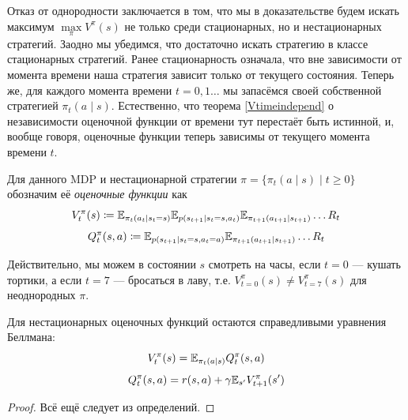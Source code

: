 Отказ от однородности заключается в том, что мы в доказательстве будем искать максимум $\max\limits_\pi V^\pi(s)$ не только среди стационарных, но и нестационарных стратегий. Заодно мы убедимся, что достаточно искать стратегию в классе стационарных стратегий. Ранее стационарность означала, что вне зависимости от момента времени наша стратегия зависит только от текущего состояния. Теперь же, для каждого момента времени $t = 0, 1 \dots$ мы запасёмся своей собственной стратегией $\pi_t(a \mid s)$. Естественно, что теорема \ref{Vtimeindepend} о независимости оценочной функции от времени тут перестаёт быть истинной, и, вообще говоря, оценочные функции теперь зависимы от текущего момента времени $t$. 

\begin{definition}
Для данного MDP и нестационарной стратегии $\pi = \{ \pi_t(a \mid s) \mid t \ge 0 \}$ обозначим её \emph{оценочные функции} как 
$$V^\pi_t(s) \coloneqq \mathbb{E}_{\pi_t(a_t \mid s_t = s)}\mathbb{E}_{p(s_{t+1} \mid s_t=s, a_t)}\mathbb{E}_{\pi_{t+1}(a_{t+1} \mid s_{t+1})} \dots R_t$$
$$Q^\pi_t(s, a) \coloneqq \mathbb{E}_{p(s_{t+1} \mid s_t=s, a_t=a)}\mathbb{E}_{\pi_{t+1}(a_{t+1} \mid s_{t+1})} \dots R_t$$
\end{definition}

\begin{example}
Действительно, мы можем в состоянии $s$ смотреть на часы, если $t=0$ --- кушать тортики, а если $t=7$ --- бросаться в лаву, т.е. $V^{\pi}_{t=0}(s) \ne V^{\pi}_{t=7}(s)$ для неоднородных $\pi$.
\end{example}

\begin{proposition}
Для нестационарных оценочных функций остаются справедливыми уравнения Беллмана:
\begin{equation}\label{VQ_nonstat}
V^\pi_t(s) = \mathbb{E}_{\pi_t(a \mid s)} Q^\pi_t(s, a)
\end{equation}
\begin{equation}\label{QV_nonstat}
Q^\pi_t(s, a) = r(s, a) + \gamma \mathbb{E}_{s'} V^\pi_{t+1}(s')
\end{equation}
\begin{proof}
Всё ещё следует из определений.
\end{proof}
\end{proposition}

